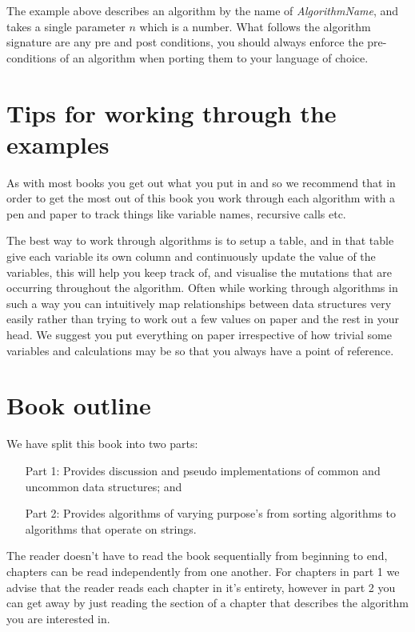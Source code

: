 The example above describes an algorithm by the name of \textit{AlgorithmName}, and takes a single parameter $n$ which is a number. What follows the algorithm signature are any pre and post conditions, you should always enforce the pre-conditions of an algorithm when porting them to your language of choice.

\section{Tips for working through the examples}
As with most books you get out what you put in and so we recommend that in order to get the most out of this book you work through each algorithm with a pen and paper to track things like variable names, recursive calls etc.

The best way to work through algorithms is to setup a table, and in that table give each variable its own column and continuously update the value of the variables, this will help you keep track of, and visualise the mutations that are occurring throughout the algorithm. Often while working through algorithms in such a way you can intuitively map relationships between data structures very easily rather than trying to work out a few values on paper and the rest in your head. We suggest you put everything on paper irrespective of how trivial some variables and calculations may be so that you always have a point of reference.

\section{Book outline}
We have split this book into two parts:

\begin{enumerate}
\item[Part 1:] Provides discussion and pseudo implementations of common and uncommon data structures; and
\item[Part 2:] Provides algorithms of varying purpose's from sorting algorithms to algorithms that operate on strings.
\end{enumerate}

The reader doesn't have to read the book sequentially from beginning to end, chapters can be read independently from one another. For chapters in part 1 we advise that the reader reads each chapter in it's entirety, however in part 2 you can get away by just reading the section of a chapter that describes the algorithm you are interested in.

